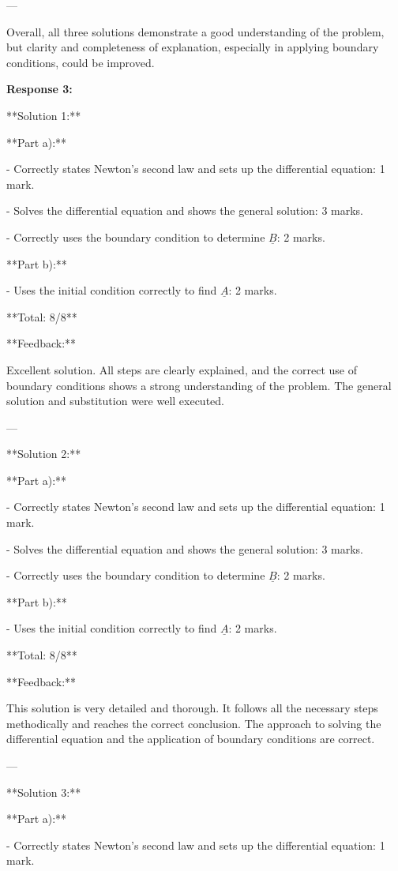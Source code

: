 \documentclass[a4paper,11pt]{article}
\begin{document}
---

Overall, all three solutions demonstrate a good understanding of the problem, but clarity and completeness of explanation, especially in applying boundary conditions, could be improved.

\bigskip
\textbf{Response 3:}

**Solution 1:**

**Part a):** 

- Correctly states Newton's second law and sets up the differential equation: 1 mark.

- Solves the differential equation and shows the general solution: 3 marks.

- Correctly uses the boundary condition to determine \( \underline{B} \): 2 marks.

**Part b):**

- Uses the initial condition correctly to find \( \underline{A} \): 2 marks.

**Total: 8/8**

**Feedback:**

Excellent solution. All steps are clearly explained, and the correct use of boundary conditions shows a strong understanding of the problem. The general solution and substitution were well executed.

---

**Solution 2:**

**Part a):** 

- Correctly states Newton's second law and sets up the differential equation: 1 mark.

- Solves the differential equation and shows the general solution: 3 marks.

- Correctly uses the boundary condition to determine \( \underline{B} \): 2 marks.

**Part b):**

- Uses the initial condition correctly to find \( \underline{A} \): 2 marks.

**Total: 8/8**

**Feedback:**

This solution is very detailed and thorough. It follows all the necessary steps methodically and reaches the correct conclusion. The approach to solving the differential equation and the application of boundary conditions are correct.

---

**Solution 3:**

**Part a):** 

- Correctly states Newton's second law and sets up the differential equation: 1 mark.
\end{document}
